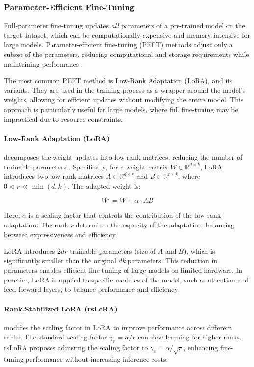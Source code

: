 \subsubsection{Parameter-Efficient Fine-Tuning} \label{app:peft}
Full-parameter fine-tuning updates \textit{all} parameters of a pre-trained model on the target dataset, which can be computationally expensive and memory-intensive for large models. Parameter-efficient fine-tuning (PEFT) methods adjust only a subset of the parameters, reducing computational and storage requirements while maintaining performance \citep{XuPARAMETEREFFICIENT2023}.

The most common PEFT method is Low-Rank Adaptation (LoRA), and its variants. They are used in the training process as a wrapper around the model's weights, allowing for efficient updates without modifying the entire model. This approach is particularly useful for large models, where full fine-tuning may be impractical due to resource constraints.

\paragraph{Low-Rank Adaptation (LoRA)} decomposes the weight updates into low-rank matrices, reducing the number of trainable parameters \citep{huLoRALowRankAdaptation2021}. Specifically, for a weight matrix \( W \in \mathbb{R}^{d \times k} \), LoRA introduces two low-rank matrices \( A \in \mathbb{R}^{d \times r} \) and \( B \in \mathbb{R}^{r \times k} \), where \( 0 < r \ll \min(d, k) \). The adapted weight is:

\begin{equation}
W' = W + \alpha \cdot A B
\end{equation}

Here, \( \alpha \) is a scaling factor that controls the contribution of the low-rank adaptation. The rank \( r \) determines the capacity of the adaptation, balancing between expressiveness and efficiency.

LoRA introduces \( 2dr \) trainable parameters (size of \( A \) and \( B \)), which is significantly smaller than the original \( dk \) parameters. This reduction in parameters enables efficient fine-tuning of large models on limited hardware. In practice, LoRA is applied to specific modules of the model, such as attention and feed-forward layers, to balance performance and efficiency.

\paragraph{Rank-Stabilized LoRA (rsLoRA)} modifies the scaling factor in LoRA to improve performance across different ranks. The standard scaling factor \( \gamma_r = \alpha / r \) can slow learning for higher ranks. rsLoRA proposes adjusting the scaling factor to \( \gamma_r = \alpha / \sqrt{r} \), enhancing fine-tuning performance without increasing inference costs.

